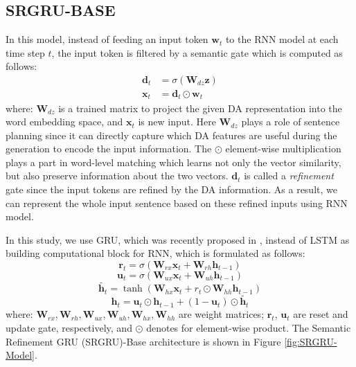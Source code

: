 \documentclass{llncs}
\begin{document}
\subsection{SRGRU-BASE}\label{subsec:srgru-base}
In this model, instead of feeding an input token $\textbf{w}_{t}$ to the RNN model at each time step $t$, the input token is filtered by a semantic gate which is computed as follows:
\begin{equation}\label{eq:d-t-1}
\begin{aligned}
	\textbf{d}_{t}&=\sigma(\textbf{W}_{dz}\textbf{z}) \\
	\textbf{x}_{t}&=\textbf{d}_{t} \odot \textbf{w}_{t} 
\end{aligned}
\end{equation}
where: $\textbf{W}_{dz}$ is a trained matrix to project the given DA representation into the word embedding space, and $\textbf{x}_{t}$ is new input. Here $\textbf{W}_{dz}$ plays a role of sentence planning since it can directly capture which DA features are useful during the generation to encode the input information. The $\odot$ element-wise multiplication plays a part in word-level matching which learns not only the vector similarity, but also preserve information about the two vectors. $\textbf{d}_{t}$ is called a \textit{refinement} gate since the input tokens are refined by the DA information. As a result, we can represent the whole input sentence based on these refined inputs using RNN model. 

In this study, we use GRU, which was recently proposed in \cite{bahdanau2014neural}, instead of LSTM as building computational block for RNN, which is formulated as follows:\vspace{25pt}
\begin{equation}\label{eq:r-t-0}
\textbf{r}_{t}=\sigma(\textbf{W}_{rx}\textbf{x}_{t}+\textbf{W}_{rh}\textbf{h}_{t-1})
\end{equation}
\begin{equation}\label{eq:u-t-0}
\textbf{u}_{t}=\sigma(\textbf{W}_{ux}\textbf{x}_{t}+\textbf{W}_{uh}\textbf{h}_{t-1})
\end{equation}
\begin{equation}\label{eq:h-t-0}
\tilde{\textbf{h}_{t}}=\tanh(\textbf{W}_{hx}\textbf{x}_{t}+r_{t}\odot \textbf{W}_{hh}\textbf{h}_{t-1})
\end{equation}
\begin{equation}
\textbf{h}_{t}= \textbf{u}_{t} \odot \textbf{h}_{t-1} + (1-\textbf{u}_{t}) \odot \tilde{\textbf{h}_{t}}
\end{equation}
where: $\textbf{W}_{rx}, \textbf{W}_{rh}, \textbf{W}_{ux}, \textbf{W}_{uh}, \textbf{W}_{hx}, \textbf{W}_{hh}$ are weight matrices; $\textbf{r}_{t}$, $\textbf{u}_{t}$ are reset and update gate, respectively, and $\odot$ denotes for element-wise product. The Semantic Refinement GRU (SRGRU)-Base architecture is shown in Figure \ref{fig:SRGRU-Model}.
\end{document}
